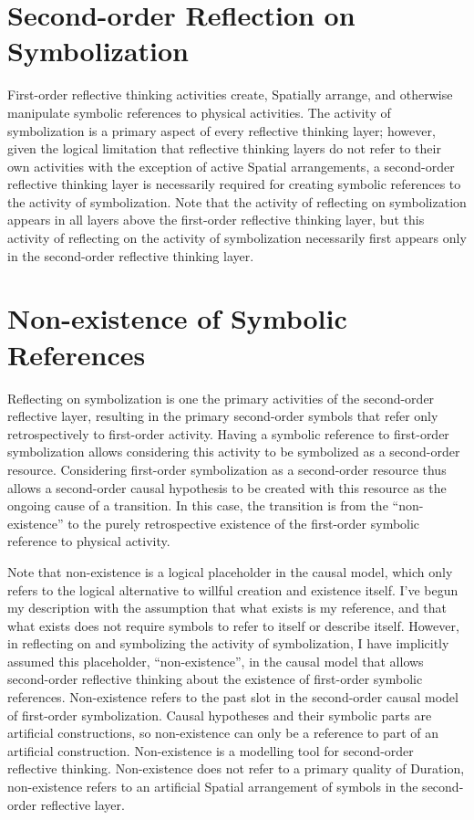 \section{Second-order Reflection on Symbolization}

First-order reflective thinking activities create, Spatially arrange,
and otherwise manipulate symbolic references to physical activities.
The activity of symbolization is a primary aspect of every reflective
thinking layer; however, given the logical limitation that reflective
thinking layers do not refer to their own activities with the
exception of active Spatial arrangements, a second-order reflective
thinking layer is necessarily required for creating symbolic
references to the activity of symbolization.  Note that the activity
of reflecting on symbolization appears in all layers above the
first-order reflective thinking layer, but this activity of reflecting
on the activity of symbolization necessarily first appears only in the
second-order reflective thinking layer.

\section{Non-existence of Symbolic References}

Reflecting on symbolization is one the primary activities of the
second-order reflective layer, resulting in the primary second-order
symbols that refer only retrospectively to first-order activity.
Having a symbolic reference to first-order symbolization allows
considering this activity to be symbolized as a second-order resource.
Considering first-order symbolization as a second-order resource thus
allows a second-order causal hypothesis to be created with this
resource as the ongoing cause of a transition.  In this case, the
transition is from the ``non-existence'' to the purely retrospective
existence of the first-order symbolic reference to physical activity.

Note that non-existence is a logical placeholder in the causal model,
which only refers to the logical alternative to willful creation and
existence itself.  I've begun my description with the assumption that
what exists is my reference, and that what exists does not require
symbols to refer to itself or describe itself.  However, in reflecting
on and symbolizing the activity of symbolization, I have implicitly
assumed this placeholder, ``non-existence'', in the causal model that
allows second-order reflective thinking about the existence of
first-order symbolic references.  Non-existence refers to the past
slot in the second-order causal model of first-order symbolization.
Causal hypotheses and their symbolic parts are artificial
constructions, so non-existence can only be a reference to part of an
artificial construction.  Non-existence is a modelling tool for
second-order reflective thinking.  Non-existence does not refer to a
primary quality of Duration, non-existence refers to an artificial
Spatial arrangement of symbols in the second-order reflective layer.

